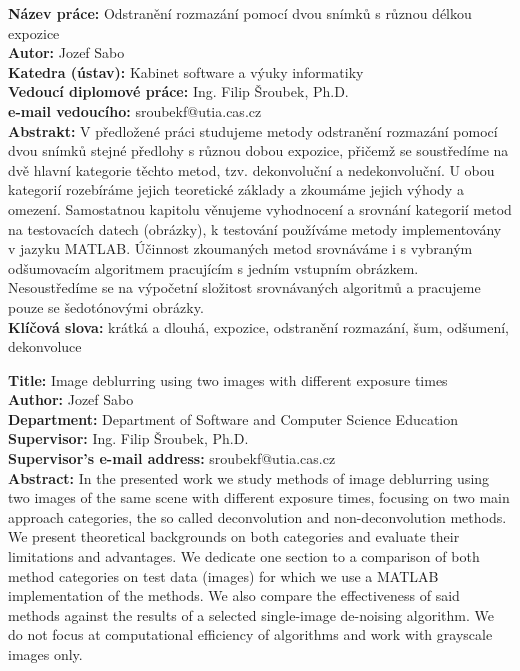 \documentclass[12pt,notitlepage]{report}
\begin{document}
\tableofcontents %
\listoffigures
\listoftables

\newpage %

\noindent
\textbf{Název práce:} Odstranění rozmazání pomocí dvou snímků s různou délkou expozice\\
\textbf{Autor:} Jozef Sabo\\
\textbf{Katedra (ústav):} Kabinet software a výuky informatiky\\
\textbf{Vedoucí diplomové práce:} Ing. Filip Šroubek, Ph.D.\\
\textbf{e-mail vedoucího:} sroubekf@utia.cas.cz\\

\noindent \textbf{Abstrakt:} V předložené práci studujeme metody odstranění rozmazání pomocí dvou snímků stejné předlohy s různou dobou expozice, přičemž se soustředíme na dvě hlavní kategorie těchto metod, tzv. dekonvoluční a nedekonvoluční. U obou kategorií rozebíráme jejich teoretické základy a zkoumáme jejich výhody a omezení. Samostatnou kapitolu věnujeme vyhodnocení a srovnání kategorií metod na testovacích datech (obrázky), k testování používáme metody implementovány v jazyku MATLAB. Účinnost zkoumaných metod srovnáváme i s vybraným odšumovacím algoritmem pracujícím s jedním vstupním obrázkem. Nesoustředíme se na výpočetní složitost srovnávaných algoritmů a pracujeme pouze se šedotónovými obrázky.\\

\noindent \textbf{Klíčová slova:} krátká a dlouhá, expozice, odstranění rozmazání, šum,  odšumení, dekonvoluce

\clearpage

\noindent
\textbf{Title:} Image deblurring using two images with different exposure times\\
\textbf{Author:} Jozef Sabo\\
\textbf{Department:} Department of Software and Computer Science Education\\
\textbf{Supervisor:} Ing. Filip Šroubek, Ph.D.\\
\textbf{Supervisor's e-mail address:} sroubekf@utia.cas.cz\\

\noindent \textbf{Abstract:} In the presented work we study methods of image deblurring using two images of the same scene with different exposure times, focusing on two main approach categories, the so called deconvolution and non-deconvolution methods. We present theoretical backgrounds on both categories and evaluate their limitations and advantages. We dedicate one section to a comparison of both method categories on test data (images) for which we use a MATLAB implementation of the methods. We also compare the effectiveness of said methods against the results of a selected single-image de-noising algorithm. We do not focus at computational efficiency of algorithms and work with grayscale images only.\\
\end{document}
